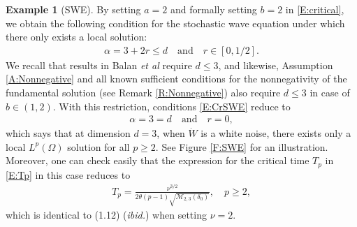 \documentclass[12pt]{report}
\theoremstyle{plain}
\theoremstyle{definition}
\newtheorem{example}[theorem]{Example}
\numberwithin{equation}{section}
\newcommand{\W}{\dot{W}}
\begin{document}
\begin{example}[SWE] \label{Eg:CriSWE}
	By setting $a=2$ and formally setting $b=2$ in \eqref{E:critical}, we obtain the following
	condition for the stochastic wave equation under which there only exists a local solution:
	\begin{align} \label{E:CrSWE}
	\alpha=3 + 2 r\le d \quad \text{and} \quad r\in[0,1/2].
	\end{align}
	We recall that results in Balan {\it et al} \cite{balan.chen.ea:22:exact} require $d\le 3$, and likewise,
	Assumption \ref{A:Nonnegative} and all known sufficient conditions for the nonnegativity of the
	fundamental solution (see Remark \ref{R:Nonnegative}) also require $d\le 3$ in case of $b\in
	(1,2)$. With this restriction, conditions \eqref{E:CrSWE} reduce to
	\begin{align*}
	\alpha=3=d \quad \text{and} \quad r=0,
	\end{align*}
	which says that at dimension $d=3$, when $\W$ is a white noise, there exists only a local
	$L^p(\Omega)$ solution for all $p\ge 2$. See Figure \ref{F:SWE} for an illustration. Moreover, one
	can check easily that the expression for the critical time $T_p$ in \eqref{E:Tp} in this case
	reduces to
	\begin{align} \label{E:TpCrSWE}
	T_p=  \frac{\nu^{3 / 2}}{2\theta (p-1) \sqrt{\mathcal{M}_{2,3}(\delta_0)}},  \quad p\ge 2,
	\end{align}
	which is identical to (1.12) ({\it ibid.}) when setting $\nu=2$. \bigskip
\end{example}
\end{document}
